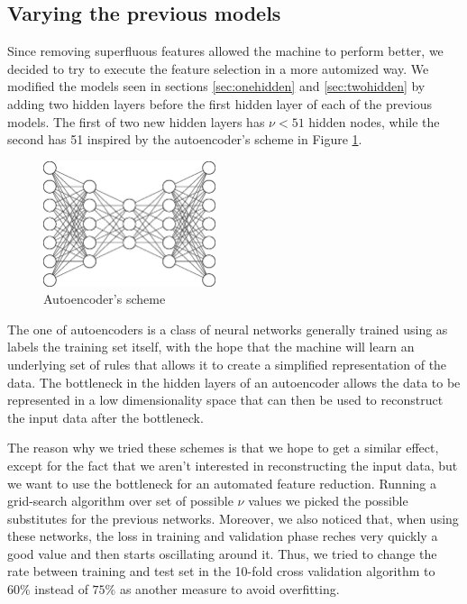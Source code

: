 \newpage
\subsection{Varying the previous models}
Since removing superfluous features allowed the machine to perform better, we decided to try to execute the feature selection in a more automized way. We modified the models seen in sections \ref{sec:onehidden} and \ref{sec:twohidden} by adding two hidden layers before the first hidden layer of each of the previous models. The first of two new hidden layers has $\nu<\text{51}$ hidden nodes, while the second has 51 inspired by the autoencoder's scheme in Figure \ref{fig:autoencoder}.
\begin{figure}
\centering
\includegraphics[width=0.45\textwidth]{./TeX_files/img/autoenc.eps}
\caption{Autoencoder's scheme}
\label{fig:autoencoder}
\end{figure}
The one of autoencoders is a class of neural networks generally trained using as labels the training set itself, with the hope that the machine will learn an underlying set of rules that allows it to create a simplified representation of the data. The bottleneck in the hidden layers of an autoencoder allows the data to be represented in a low dimensionality space that can then be used to reconstruct the input data after the bottleneck. 

The reason why we tried these schemes is that we hope to get a similar effect, except for the fact that we aren't interested in reconstructing the input data, but we want to use the bottleneck for an automated feature reduction. Running a grid-search algorithm over set of possible $\nu$ values we picked the possible substitutes for the previous networks. Moreover, we also noticed that, when using these networks, the loss in training and validation phase reches very quickly a good value and then starts oscillating around it. Thus, we tried to change the rate between training and test set in the 10-fold cross validation algorithm to $60\%$ instead of $75\%$ as another measure to avoid overfitting.
